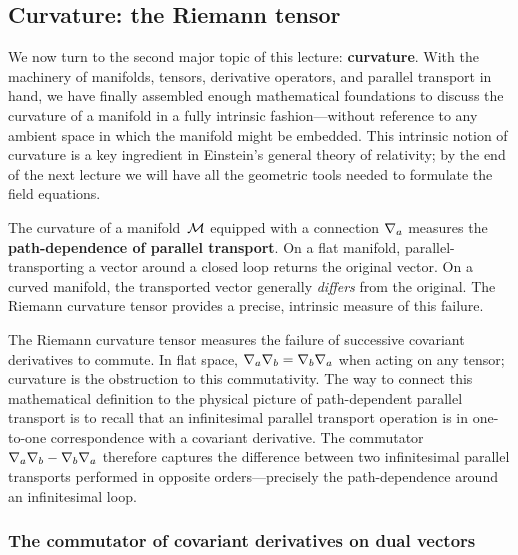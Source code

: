 \subsection{Curvature: the Riemann tensor}%
\label{sec:riemann-tensor}

We now turn to the second major topic of this lecture:
\textbf{curvature}.  With the machinery of manifolds, tensors,
derivative operators, and parallel transport in hand, we have
finally assembled enough mathematical foundations to discuss the
curvature of a manifold in a fully intrinsic fashion---without
reference to any ambient space in which the manifold might be
embedded.  This intrinsic notion of curvature is a key
ingredient in Einstein's general theory of relativity; by the
end of the next lecture we will have all the geometric tools
needed to formulate the field equations.

The curvature of a manifold~$\mathcal{M}$ equipped with a connection
$\nabla_a$ measures the \textbf{path-dependence of parallel
transport}.  On a flat manifold, parallel-transporting a vector
around a closed loop returns the original vector.  On a curved
manifold, the transported vector generally \emph{differs} from
the original.  The Riemann curvature tensor provides a precise,
intrinsic measure of this failure.

\begin{intuition}
  The Riemann curvature tensor measures the failure of
  successive covariant derivatives to commute.  In flat space,
  $\nabla_a\nabla_b = \nabla_b\nabla_a$ when acting on any tensor;
  curvature is the obstruction to this commutativity.
  The way to connect this mathematical definition to the
  physical picture of path-dependent parallel transport is to
  recall that an infinitesimal parallel transport operation
  is in one-to-one correspondence with a covariant derivative.
  The commutator $\nabla_a\nabla_b - \nabla_b\nabla_a$ therefore
  captures the difference between two infinitesimal parallel
  transports performed in opposite orders---precisely the
  path-dependence around an infinitesimal loop.
\end{intuition}

\subsubsection{The commutator of covariant derivatives on
  dual vectors}\label{sec:commutator-covd}

